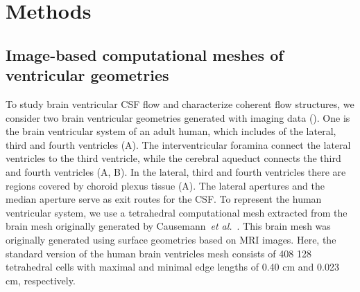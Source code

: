 \documentclass{template}
\begin{document}
\section{Methods}
\subsection{Image-based computational meshes of ventricular geometries}
To study brain ventricular CSF flow and characterize coherent flow structures,
we consider two brain ventricular geometries generated with imaging data
(). One is the brain ventricular system of an adult human,
which includes of the lateral, third and fourth ventricles (A).
The interventricular foramina connect the lateral ventricles to the third ventricle,
while the cerebral aqueduct connects the third and fourth ventricles (A, B).
In the lateral, third and fourth ventricles there are regions covered by choroid plexus tissue
(A). The lateral apertures and the median aperture serve as exit routes for the CSF.
To represent the human ventricular system, we use a tetrahedral computational mesh extracted
from the brain mesh originally generated by Causemann~\emph{et al.}~\cite{Causemann2022HumanFramework}.
This brain mesh was originally generated using surface geometries based on MRI images.
Here, the standard version of the human brain ventricles mesh consists of
408 128 tetrahedral cells with maximal and minimal edge lengths
of 0.40 cm and 0.023 cm, respectively.
\end{document}
